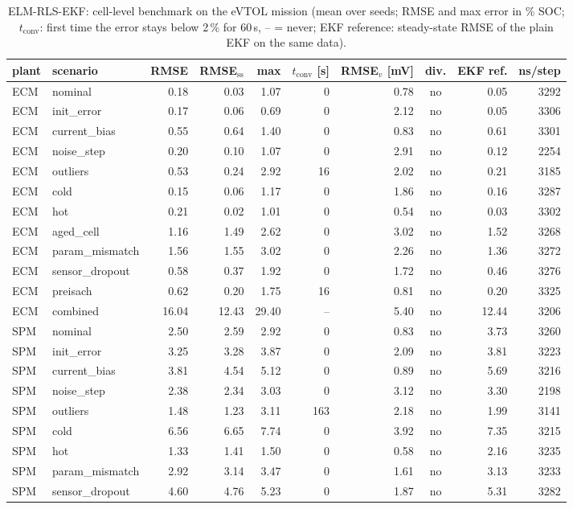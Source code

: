 \begin{table}[H]\centering\footnotesize\setlength{\tabcolsep}{4pt}
\caption{ELM-RLS-EKF: cell-level benchmark on the eVTOL mission (mean over seeds; RMSE and max error in \% SOC; $t_\mathrm{conv}$: first time the error stays below 2\,\% for 60\,s, -- = never; EKF reference: steady-state RMSE of the plain EKF on the same data).}\label{tab:cell_ELMRLSEKF}
\begin{tabular}{llrrrrrcrr}\toprule
plant & scenario & RMSE & RMSE$_\mathrm{ss}$ & max & $t_\mathrm{conv}$ [s] & RMSE$_v$ [mV] & div. & EKF ref. & ns/step \\ \midrule
ECM & nominal & 0.18 & 0.03 & 1.07 & 0 & 0.78 & no & 0.05 & 3292 \\
ECM & init\_error & 0.17 & 0.06 & 0.69 & 0 & 2.12 & no & 0.05 & 3306 \\
ECM & current\_bias & 0.55 & 0.64 & 1.40 & 0 & 0.83 & no & 0.61 & 3301 \\
ECM & noise\_step & 0.20 & 0.10 & 1.07 & 0 & 2.91 & no & 0.12 & 2254 \\
ECM & outliers & 0.53 & 0.24 & 2.92 & 16 & 2.02 & no & 0.21 & 3185 \\
ECM & cold & 0.15 & 0.06 & 1.17 & 0 & 1.86 & no & 0.16 & 3287 \\
ECM & hot & 0.21 & 0.02 & 1.01 & 0 & 0.54 & no & 0.03 & 3302 \\
ECM & aged\_cell & 1.16 & 1.49 & 2.62 & 0 & 3.02 & no & 1.52 & 3268 \\
ECM & param\_mismatch & 1.56 & 1.55 & 3.02 & 0 & 2.26 & no & 1.36 & 3272 \\
ECM & sensor\_dropout & 0.58 & 0.37 & 1.92 & 0 & 1.72 & no & 0.46 & 3276 \\
ECM & preisach & 0.62 & 0.20 & 1.75 & 16 & 0.81 & no & 0.20 & 3325 \\
ECM & combined & 16.04 & 12.43 & 29.40 & -- & 5.40 & no & 12.44 & 3206 \\
\midrule
SPM & nominal & 2.50 & 2.59 & 2.92 & 0 & 0.83 & no & 3.73 & 3260 \\
SPM & init\_error & 3.25 & 3.28 & 3.87 & 0 & 2.09 & no & 3.81 & 3223 \\
SPM & current\_bias & 3.81 & 4.54 & 5.12 & 0 & 0.89 & no & 5.69 & 3216 \\
SPM & noise\_step & 2.38 & 2.34 & 3.03 & 0 & 3.12 & no & 3.30 & 2198 \\
SPM & outliers & 1.48 & 1.23 & 3.11 & 163 & 2.18 & no & 1.99 & 3141 \\
SPM & cold & 6.56 & 6.65 & 7.74 & 0 & 3.92 & no & 7.35 & 3215 \\
SPM & hot & 1.33 & 1.41 & 1.50 & 0 & 0.58 & no & 2.16 & 3235 \\
SPM & param\_mismatch & 2.92 & 3.14 & 3.47 & 0 & 1.61 & no & 3.13 & 3233 \\
SPM & sensor\_dropout & 4.60 & 4.76 & 5.23 & 0 & 1.87 & no & 5.31 & 3282 \\
\bottomrule\end{tabular}\end{table}
